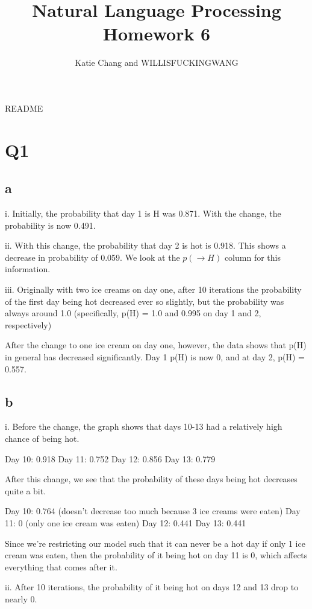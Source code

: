 \documentclass[12pt, letterpaper]{article}
\title{Natural Language Processing Homework 6}
\author{Katie Chang and WILLISFUCKINGWANG}
\begin{document}
\maketitle

README

\section{Q1}
\subsection{a}
i. Initially, the probability that day 1 is H was 0.871. With the change, the probability is now 0.491.

ii. With this change, the probability that day 2 is hot is 0.918. This shows a decrease in probability of 0.059.
We look at the $p(\rightarrow H)$ column for this information.

iii. Originally with two ice creams on day one, after 10 iterations the probability of the first day being hot decreased ever so slightly, but the probability was always around 1.0 (specifically, p(H) = 1.0 and 0.995 on day 1 and 2, respectively)

After the change to one ice cream on day one, however, the data shows that p(H) in general has decreased significantly. Day 1 p(H) is now 0, and at day 2, p(H) = 0.557.

\subsection{b}

i. Before the change, the graph shows that days 10-13 had a relatively high chance of being hot.

Day 10: 0.918
Day 11: 0.752
Day 12: 0.856
Day 13: 0.779

After this change, we see that the probability of these days being hot decreases quite a bit.

Day 10: 0.764 (doesn't decrease too much because 3 ice creams were eaten)
Day 11: 0 (only one ice cream was eaten)
Day 12: 0.441
Day 13: 0.441

Since we're restricting our model such that it can never be a hot day if only 1 ice cream was eaten, then the probability of it being hot on day 11 is 0, which affects everything that comes after it.

ii. After 10 iterations, the probability of it being hot on days 12 and 13 drop to nearly 0. 
\end{document}
